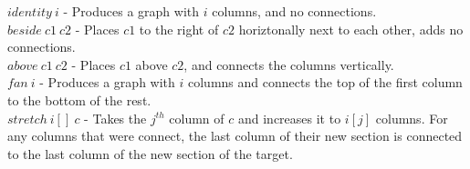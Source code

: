 \documentclass[11pt,a4paper]{article}
\begin{document}

$identity\ i$ - Produces a graph with $i$ columns, and no connections.\\
$beside\ c1\ c2$ - Places $c1$ to the right of $c2$ horiztonally next to each other, adds no connections.\\
$above\ c1\ c2$ - Places $c1$ above $c2$, and connects the columns vertically.\\
$fan\ i$ - Produces a graph with $i$ columns and connects the top of the first column to the bottom of the rest.\\
$stretch\ i[]\ c$ - Takes the $j^{th}$ column of $c$ and increases it to $i[j]$ columns. For any columns that were connect, the last column of their new section is connected to the last column of the new section of the target.\\
\end{document}
